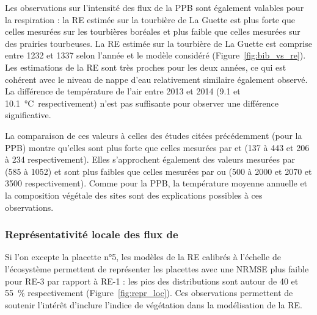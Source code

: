 Les observations sur l'intensité des flux de la PPB sont également valables pour la respiration : la RE estimée sur la tourbière de La Guette est plus forte que celles mesurées sur les tourbières boréales et plus faible que celles mesurées sur des prairies tourbeuses.
La RE estimée sur la tourbière de La Guette est comprise entre 1232 et \SI{1337}{\gcma} selon l'année et le modèle considéré (Figure~\ref{fig:bib_vs_re}).
Les estimations de la RE sont très proches pour les deux années, ce qui est cohérent avec le niveau de nappe d'eau relativement similaire également observé.
La différence de température de l'air entre 2013 et 2014 (\num{9.1} et \SI{10.1}{\degreeCelsius respectivement}) n'est pas suffisante pour observer une différence significative.

La comparaison de ces valeurs à celles des études citées précédemment (pour la PPB) montre qu'elles sont plus forte que celles mesurées par \citet{peichl2014} et \citet{trudeau2014} (137 à \SI{443}{\gcma} et 206 à \SI{234}{\gcma} respectivement).
Elles s'approchent également des valeurs mesurées par \citet{beyer2015} (585 à \SI{1052}{\gcma}) et sont plus faibles que celles mesurées par \citet{jacobs2007} ou \citet{gorres2014} (500 à \SI{2000}{\gcma} et 2070 et \SI{3500}{\gcma} respectivement).
Comme pour la PPB, la température moyenne annuelle et la composition végétale des sites sont des explications possibles à ces observations.



\subsubsection{Représentativité locale des flux de \coo}

Si l'on excepte la placette n°5, les modèles de la RE calibrés à l'échelle de l'écosystème permettent de représenter les placettes avec une NRMSE plus faible pour RE-3 par rapport à RE-1 : les pics des distributions sont autour de 40 et \SI{55}{\percent} respectivement (Figure~\ref{fig:repr_loc}).
Ces observations permettent de soutenir l'intérêt d'inclure l'indice de végétation dans la modélisation de la RE.

